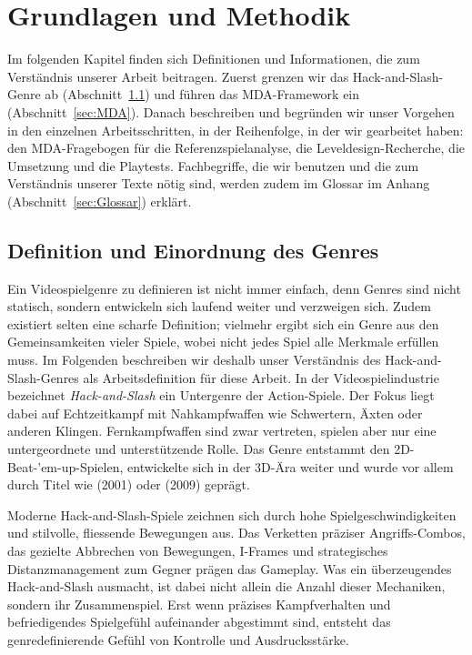 \documentclass[../Main.tex]{subfiles}
\begin{document}
\section{Grundlagen und Methodik} \label{sec:Grundlagen}
Im folgenden Kapitel finden sich Definitionen und Informationen, die zum Verständnis unserer Arbeit beitragen. Zuerst grenzen wir das Hack-and-Slash-Genre ab (Abschnitt~\ref{sec:Genredefinition}) und führen das MDA-Framework ein (Abschnitt~\ref{sec:MDA}). Danach beschreiben und begründen wir unser Vorgehen in den einzelnen Arbeitsschritten, in der Reihenfolge, in der wir gearbeitet haben: den MDA-Fragebogen für die Referenzspielanalyse, die Leveldesign-Recherche, die Umsetzung und die Playtests. Fachbegriffe, die wir benutzen und die zum Verständnis unserer Texte nötig sind, werden zudem im Glossar im Anhang (Abschnitt~\ref{sec:Glossar}) erklärt.

\subsection{Definition und Einordnung des Genres} \label{sec:Genredefinition}
Ein Videospielgenre zu definieren ist nicht immer einfach, denn Genres sind nicht statisch, sondern entwickeln sich laufend weiter und verzweigen sich. Zudem existiert selten eine scharfe Definition; vielmehr ergibt sich ein Genre aus den Gemeinsamkeiten vieler Spiele, wobei nicht jedes Spiel alle Merkmale erfüllen muss. Im Folgenden beschreiben wir deshalb unser Verständnis des Hack-and-Slash-Genres als Arbeitsdefinition für diese Arbeit. In der Videospielindustrie bezeichnet \textit{Hack-and-Slash} ein Untergenre der Action-Spiele. Der Fokus liegt dabei auf Echtzeitkampf mit Nahkampfwaffen wie Schwertern, Äxten oder anderen Klingen. Fernkampfwaffen sind zwar vertreten, spielen aber nur eine untergeordnete und unterstützende Rolle. Das Genre entstammt den 2D-Beat-'em-up-Spielen, entwickelte sich in der 3D-Ära weiter und wurde vor allem durch Titel wie  (2001)\autocite{capcom_devilmaycry_2001} oder  (2009)\autocite{platinumgames_bayonetta_2009} geprägt.\autocite{wikipedia_hackandslash}

Moderne Hack-and-Slash-Spiele zeichnen sich durch hohe Spielgeschwindigkeiten und stilvolle, fliessende Bewegungen aus. Das Verketten präziser Angriffs-Combos, das gezielte Abbrechen von Bewegungen, I-Frames und strategisches Distanzmanagement zum Gegner prägen das Gameplay. Was ein überzeugendes Hack-and-Slash ausmacht, ist dabei nicht allein die Anzahl dieser Mechaniken, sondern ihr Zusammenspiel. Erst wenn präzises Kampfverhalten und befriedigendes Spielgefühl aufeinander abgestimmt sind, entsteht das genredefinierende Gefühl von Kontrolle und Ausdrucksstärke.\autocite[5--7]{lindgren2025striking}
\end{document}
